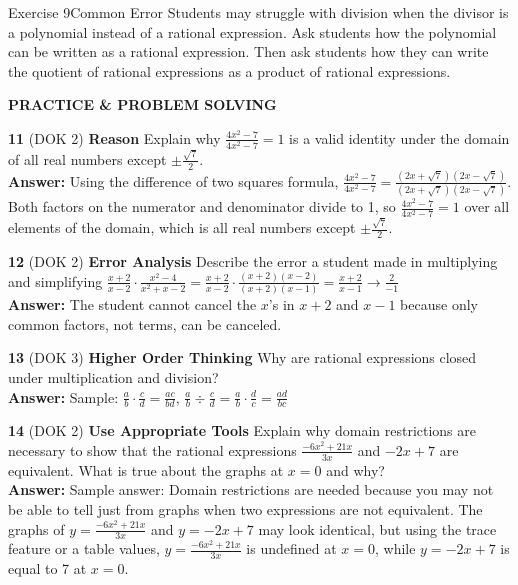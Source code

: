 \documentclass{article}
\newenvironment{practice}[2]{\textbf{#1} (DOK #2)}{}
\newenvironment{te-addendum}[2]{\textbf{TE (#1 - #2)}}{}
\newcommand{\answer}[1]{\textbf{Answer:} #1}
\begin{document}
\begin{te-addendum}{Exercise 9}{Common Error}
Students may struggle with division when the divisor is a polynomial instead of a rational expression. Ask students how the polynomial can be written as a rational expression. Then ask students how they can write the quotient of rational expressions as a product of rational expressions.
\end{te-addendum}

\textbf{PRACTICE \& PROBLEM SOLVING}

\begin{practice}{11}{2}
\textbf{Reason} Explain why $\frac{4x^2 - 7}{4x^2 - 7} = 1$ is a valid identity under the domain of all real numbers except $\pm \frac{\sqrt{7}}{2}$. \\
\answer{Using the difference of two squares formula, $\frac{4x^2 - 7}{4x^2 - 7} = \frac{(2x + \sqrt{7})(2x - \sqrt{7})}{(2x + \sqrt{7})(2x - \sqrt{7})}$. Both factors on the numerator and denominator divide to 1, so $\frac{4x^2 - 7}{4x^2 - 7} = 1$ over all elements of the domain, which is all real numbers except $\pm \frac{\sqrt{7}}{2}$.}
\end{practice}

\begin{practice}{12}{2}
\textbf{Error Analysis} Describe the error a student made in multiplying and simplifying
$\frac{x+2}{x-2} \cdot \frac{x^2 - 4}{x^2 + x - 2} = \frac{x+2}{x-2} \cdot \frac{(x+2)(x-2)}{(x+2)(x-1)} = \frac{x+2}{x-1} \rightarrow \frac{2}{-1}$ \\
\answer{The student cannot cancel the $x$'s in $x+2$ and $x-1$ because only common factors, not terms, can be canceled.}
\end{practice}

\begin{practice}{13}{3}
\textbf{Higher Order Thinking} Why are rational expressions closed under multiplication and division? \\
\answer{Sample: $\frac{a}{b} \cdot \frac{c}{d} = \frac{ac}{bd}$, $\frac{a}{b} \div \frac{c}{d} = \frac{a}{b} \cdot \frac{d}{c} = \frac{ad}{bc}$}
\end{practice}

\begin{practice}{14}{2}
\textbf{Use Appropriate Tools} Explain why domain restrictions are necessary to show that the rational expressions $\frac{-6x^2 + 21x}{3x}$ and $-2x + 7$ are equivalent. What is true about the graphs at $x = 0$ and why? \\
\answer{Sample answer: Domain restrictions are needed because you may not be able to tell just from graphs when two expressions are not equivalent. The graphs of $y = \frac{-6x^2 + 21x}{3x}$ and $y = -2x + 7$ may look identical, but using the trace feature or a table values, $y = \frac{-6x^2 + 21x}{3x}$ is undefined at $x = 0$, while $y = -2x + 7$ is equal to 7 at $x = 0$.}
\end{practice}
\end{document}
